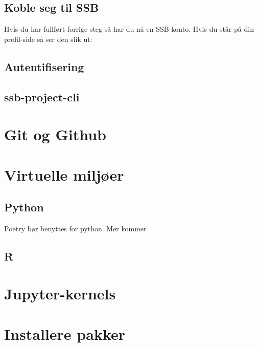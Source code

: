 \documentclass[
  letterpaper,
  DIV=11,
  numbers=noendperiod]{scrreprt}
\begin{document}
\hypertarget{koble-seg-til-ssb}{%
\section{Koble seg til SSB}\label{koble-seg-til-ssb}}

Hvis du har fullført forrige steg så har du nå en SSB-konto. Hvis du
står på din profil-side så ser den slik ut:

\hypertarget{autentifisering}{%
\section{Autentifisering}\label{autentifisering}}

\hypertarget{ssb-project-cli}{%
\section{ssb-project-cli}\label{ssb-project-cli}}

\hypertarget{git-og-github}{%
\chapter{Git og Github}\label{git-og-github}}

\hypertarget{virtuelle-miljuxf8er}{%
\chapter{Virtuelle miljøer}\label{virtuelle-miljuxf8er}}

\hypertarget{python}{%
\section{Python}\label{python}}

Poetry bør benyttes for python. Mer kommer

\hypertarget{r}{%
\section{R}\label{r}}

\hypertarget{jupyter-kernels}{%
\chapter{Jupyter-kernels}\label{jupyter-kernels}}

\hypertarget{installere-pakker}{%
\chapter{Installere pakker}\label{installere-pakker}}
\end{document}
